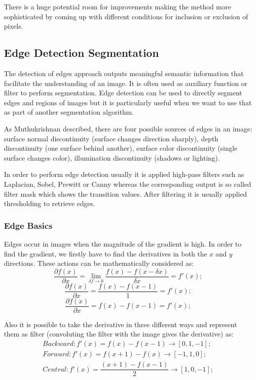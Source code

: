 There is a huge potential room for improvements making the method more sophisticated by coming up with different conditions for inclusion or exclusion of pixels.

\subsection{Edge Detection Segmentation}
The detection of edges approach outputs meaningful semantic information that facilitate the understanding of an image. It is often used as auxiliary function or filter to perform segmentation. Edge detection can be used to directly segment edges and regions of images but it is particularly useful when we want to use that as part of another segmentation algorithm.

As Muthukrishnan \cite{Muthukrishnan2011} described, there are four possible sources of edges in an image: surface normal discontinuity (surface changes direction sharply), depth discontinuity (one surface behind another), surface color discontinuity (single surface changes color), illumination discontinuity (shadows or lighting).

In order to perform edge detection usually it is applied high-pass filters such as Laplacian, Sobel, Prewitt or Canny whereas the corresponding output is so called filter mask which shows the transition values. After filtering it is usually applied thresholding to retrieve edges.

\subsubsection{Edge Basics}
Edges occur in images when the magnitude of the gradient is high. In order to find the gradient, we firstly have to find the derivatives in both the $x$ and $y$ directions. These actions can be mathematically considered as:
\[ \frac{\partial f (x)}{\partial x} = \lim_{\delta{f} \to 0} \dfrac{f(x) - f(x - \delta x)}{\delta x}  = f'(x); \]
\[ \frac{\partial f (x)}{\partial x} = \dfrac{f(x) - f(x - 1)}{1}  = f'(x); \]
\[ \frac{\partial f (x)}{\partial x} = f(x) - f(x - 1) = f'(x); \]

Also it is possible to take the derivative in three different ways and represent them as filter (convoluting the filter with the image gives the derivative) as:
\begin{align*}
Backward: f'(x) = f(x) - f(x - 1) \to [0, 1, -1]; \\
Forward:  f'(x) = f(x + 1) - f(x) \to [-1, 1, 0]; \\
Central:  f'(x) = \dfrac{(x + 1) - f(x - 1)}{2} \to [1, 0, -1];
\end{align*}

